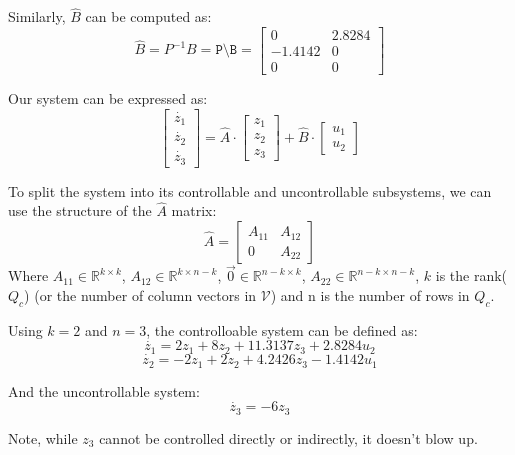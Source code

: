\documentclass[10pt]{article}
\begin{document}
Similarly, $\hat{B}$ can be computed as:
\begin{equation*}
    \hat{B} = P^{-1}B = \texttt{P\textbackslash B} = 
    \begin{bmatrix}
        0 & 2.8284 \\
        -1.4142 & 0 \\ 
        0 & 0 
    \end{bmatrix}
\end{equation*}

Our system can be expressed as:
\begin{equation*}
    \begin{bmatrix}
        \dot{z_1} \\
        \dot{z_2} \\
        \dot{z_3}
    \end{bmatrix}
    = 
    \hat{A} \cdot \begin{bmatrix}
        z_1\\z_2\\z_3
    \end{bmatrix} +
    \hat{B} \cdot \begin{bmatrix}
        u_1 \\ u_2
    \end{bmatrix}
\end{equation*}

To split the system into its controllable and uncontrollable subsystems, we can use the structure of the $\hat{A}$ matrix:
\begin{equation*}
    \hat{A} = 
    \begin{bmatrix}
        A_{11} & A_{12}\\
        0 & A_{22}
    \end{bmatrix}
\end{equation*}
Where $A_{11} \in \mathbb{R}^{k\times k}$, $A_{12} \in \mathbb{R}^{k \times n-k}$, $\vec{0} \in \mathbb{R}^{n-k \times k}$, $A_{22} \in \mathbb{R}^{n-k \times n-k}$, $k$ is the rank($Q_c$) (or the number of column vectors in $\mathcal{V}$) and n is the number of rows in $Q_c$.

Using $k = 2$ and $n = 3$, the controlloable system can be defined as:
\begin{equation*}
    \dot{z_1} = 2z_1 + 8z_2 + 11.3137z_3 + 2.8284u_2
\end{equation*}
\begin{equation*}
    \dot{z_2} = - 2z_1 + 2z_2 + 4.2426z_3 - 1.4142u_1
\end{equation*}

And the uncontrollable system:
\begin{equation*}
    \dot{z_3} = -6z_3
\end{equation*}

Note, while $z_3$ cannot be controlled directly or indirectly, it doesn't blow up. 
\end{document}
